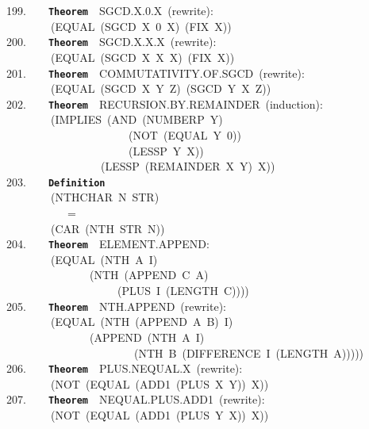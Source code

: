 \documentclass[11pt]{book}
\newenvironment{pubasis}{\begin{flushleft}\ttfamily\small}{\normalsize\rmfamily\end{flushleft}}
\newcommand{\axiomordefinition}[1]{\vspace{6pt}\texttt{\textbf{#1}}}
\begin{document}
\begin{pubasis}
199.~~~~\axiomordefinition{Theorem}~~SGCD.X.0.X~(rewrite):\\
~~~~~~~~(EQUAL~(SGCD~X~0~X)~(FIX~X))\\

200.~~~~\axiomordefinition{Theorem}~~SGCD.X.X.X~(rewrite):\\
~~~~~~~~(EQUAL~(SGCD~X~X~X)~(FIX~X))\\

201.~~~~\axiomordefinition{Theorem}~~COM\-MU\-TA\-TIV\-ITY.OF.SGCD~(rewrite):\\
~~~~~~~~(EQUAL~(SGCD~X~Y~Z)~(SGCD~Y~X~Z))\\

202.~~~~\axiomordefinition{Theorem}~~RECURSION.BY.REMAINDER~(induction):\\
~~~~~~~~(IMPLIES~(AND~(NUMBERP~Y)\\
~~~~~~~~~~~~~~~~~~~~~~(NOT~(EQUAL~Y~0))\\
~~~~~~~~~~~~~~~~~~~~~~(LESSP~Y~X))\\
~~~~~~~~~~~~~~~~~(LESSP~(REMAINDER~X~Y)~X))\\

203.~~~~\axiomordefinition{Definition}\\
~~~~~~~~(NTHCHAR~N~STR)\\
~~~~~~~~~~~=\\
~~~~~~~~(CAR~(NTH~STR~N))\\

204.~~~~\axiomordefinition{Theorem}~~ELEMENT.APPEND:\\
~~~~~~~~(EQUAL~(NTH~A~I)\\
~~~~~~~~~~~~~~~(NTH~(APPEND~C~A)\\
~~~~~~~~~~~~~~~~~~~~(PLUS~I~(LENGTH~C))))\\

205.~~~~\axiomordefinition{Theorem}~~NTH.APPEND~(rewrite):\\
~~~~~~~~(EQUAL~(NTH~(APPEND~A~B)~I)\\
~~~~~~~~~~~~~~~(APPEND~(NTH~A~I)\\
~~~~~~~~~~~~~~~~~~~~~~~(NTH~B~(DIFFERENCE~I~(LENGTH~A)))))\\

206.~~~~\axiomordefinition{Theorem}~~PLUS.NEQUAL.X~(rewrite):\\
~~~~~~~~(NOT~(EQUAL~(ADD1~(PLUS~X~Y))~X))\\

207.~~~~\axiomordefinition{Theorem}~~NEQUAL.PLUS.ADD1~(rewrite):\\
~~~~~~~~(NOT~(EQUAL~(ADD1~(PLUS~Y~X))~X))\\


\end{pubasis}
\end{document}
